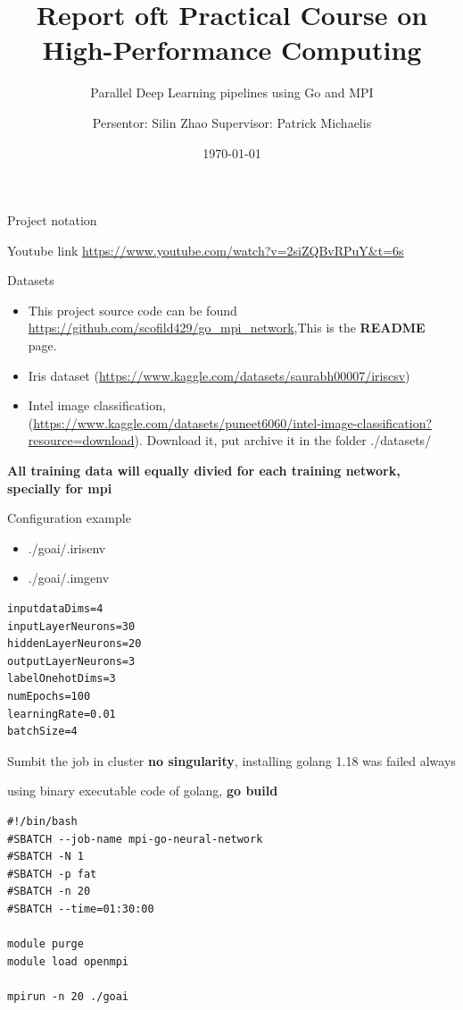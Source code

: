 \documentclass[presentation]{beamer}
\author{Persentor: Silin Zhao Supervisor: Patrick Michaelis}
\date{\today}
\title{Report oft Practical Course on High-Performance Computing}
\subtitle{ Parallel Deep Learning pipelines using Go and MPI }
\begin{document}
\maketitle
\begin{frame}[label={sec:org59bb5fb}]{Project notation}
\begin{block}{Youtube link}
\url{https://www.youtube.com/watch?v=2siZQBvRPuY\&t=6s}
\end{block}
\begin{block}{Datasets}
\begin{itemize}
\item This project source code can be found \url{https://github.com/scofild429/go\_mpi\_network},This is the \textbf{README} page.
\item Iris dataset (\url{https://www.kaggle.com/datasets/saurabh00007/iriscsv})
\item Intel image classification, (\url{https://www.kaggle.com/datasets/puneet6060/intel-image-classification?resource=download}). Download it,  put archive it in the folder ./datasets/
\end{itemize}

\textbf{All training data will equally divied for each training network, specially for mpi}
\end{block}
\end{frame}

\begin{frame}[label={sec:orgc6ef77f},fragile]{Configuration  example}
 \begin{itemize}
\item ./goai/.irisenv
\item ./goai/.imgenv
\end{itemize}
\begin{verbatim}
inputdataDims=4
inputLayerNeurons=30
hiddenLayerNeurons=20
outputLayerNeurons=3
labelOnehotDims=3
numEpochs=100
learningRate=0.01
batchSize=4
\end{verbatim}
\end{frame}

\begin{frame}[label={sec:org68361bb},fragile]{Sumbit the job in cluster}
 \textbf{no singularity}, installing golang 1.18 was failed always

using binary executable code of golang, \textbf{go build}

\begin{verbatim}
#!/bin/bash
#SBATCH --job-name mpi-go-neural-network
#SBATCH -N 1
#SBATCH -p fat
#SBATCH -n 20
#SBATCH --time=01:30:00

module purge
module load openmpi

mpirun -n 20 ./goai
\end{verbatim}
\end{frame}
\end{document}
